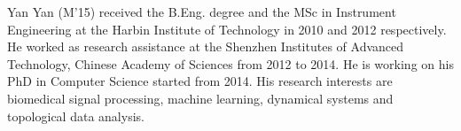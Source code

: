 \documentclass[journal]{IEEEtran}
\begin{document}








% 

\begin{IEEEbiography}{Yan Yan}
(M'15) received the B.Eng. degree and the MSc in Instrument Engineering at the Harbin Institute of Technology in 2010 and 2012 respectively. He worked as research assistance at the Shenzhen Institutes of Advanced Technology, Chinese Academy of Sciences from 2012 to 2014. He is working on his PhD in Computer Science started from 2014. His research interests are biomedical signal processing, machine learning, dynamical systems and topological data analysis.
\end{IEEEbiography}
\end{document}
